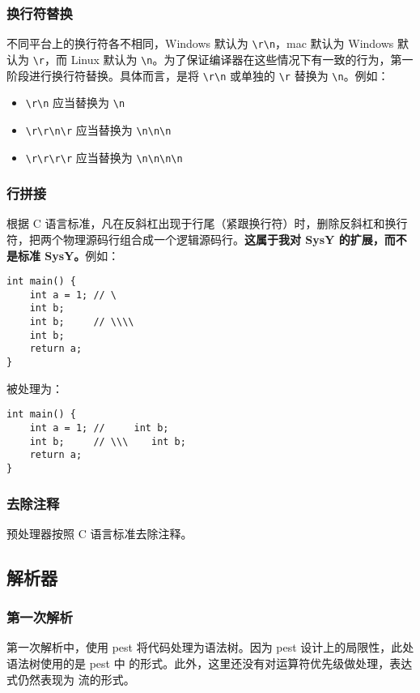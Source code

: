 \subsubsection{换行符替换}\label{stage-1}
不同平台上的换行符各不相同，Windows 默认为 \texttt{\textbackslash r\textbackslash n}，mac 默认为 Windows 默认为 \texttt{\textbackslash r}，而 Linux 默认为 \texttt{\textbackslash n}。为了保证编译器在这些情况下有一致的行为，第一阶段进行换行符替换。具体而言，是将 \texttt{\textbackslash r\textbackslash n} 或单独的 \texttt{\textbackslash r} 替换为 \texttt{\textbackslash n}。例如：
\begin{itemize}
    \item \texttt{\textbackslash r\textbackslash n} 应当替换为 \texttt{\textbackslash n}
    \item \texttt{\textbackslash r\textbackslash r\textbackslash n\textbackslash r} 应当替换为 \texttt{\textbackslash n\textbackslash n\textbackslash n}
    \item \texttt{\textbackslash r\textbackslash r\textbackslash r\textbackslash r} 应当替换为 \texttt{\textbackslash n\textbackslash n\textbackslash n\textbackslash n}
\end{itemize}
\subsubsection{行拼接}\label{stage-2}
根据 C 语言标准，凡在反斜杠出现于行尾（紧跟换行符）时，删除反斜杠和换行符，把两个物理源码行组合成一个逻辑源码行。\textbf{这属于我对 SysY 的扩展，而不是标准 SysY。}例如：
\begin{verbatim}
int main() {
    int a = 1; // \
    int b;
    int b;     // \\\\
    int b;
    return a;
}
\end{verbatim}
被处理为：
\begin{verbatim}
int main() {
    int a = 1; //     int b;
    int b;     // \\\    int b;
    return a;
}
\end{verbatim}
\subsubsection{去除注释}
预处理器按照 C 语言标准去除注释。
\subsection{解析器}
\subsubsection{第一次解析}
第一次解析中，使用 pest 将代码处理为语法树。因为 pest 设计上的局限性，此处语法树使用的是 pest 中  的形式。此外，这里还没有对运算符优先级做处理，表达式仍然表现为  流的形式。
